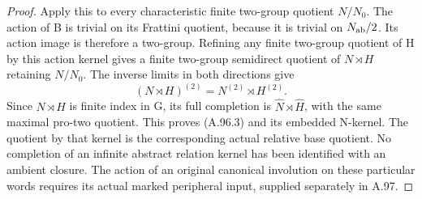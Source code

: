 \begin{proof}
Apply this to every characteristic finite two-group quotient
\(N/N_0\). The action of B is trivial on its Frattini quotient,
because it is trivial on \(N_{\rm ab}/2\). Its action image is
therefore a two-group. Refining any finite two-group quotient of H
by this action kernel gives a finite two-group semidirect quotient
of \(N\rtimes H\) retaining \(N/N_0\). The inverse limits in both
directions give
\[
 (N\rtimes H)^{(2)}=N^{(2)}\rtimes H^{(2)}.
 \tag{A.96.5}
\]
Since \(N\rtimes H\) is finite index in G, its full completion is
\(\widehat N\rtimes\widehat H\), with the same maximal pro-two
quotient. This proves (A.96.3) and its embedded N-kernel. The quotient
by that kernel is the corresponding actual relative base quotient.
No completion of an infinite abstract relation kernel has been
identified with an ambient closure. The action of an original
canonical involution on these particular words requires its actual
marked peripheral input, supplied separately in A.97.
\end{proof}
